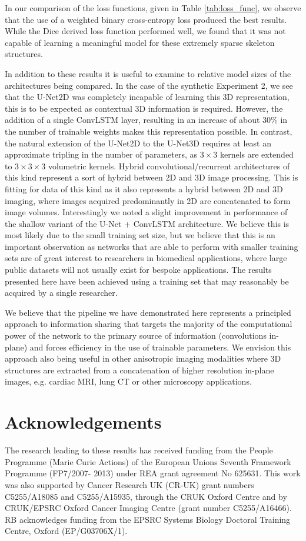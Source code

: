 \documentclass[journal,transmag]{IEEEtran}
\begin{document}
In our comparison of the loss functions, given in Table \ref{tab:loss_func}, we observe that the use of a weighted binary cross-entropy loss produced the best results. While the Dice derived loss function performed well, we found that it was not capable of learning a meaningful model for these extremely sparse skeleton structures.

In addition to these results it is useful to examine to relative model sizes of the architectures being compared. In the case of the synthetic Experiment 2, we see that the U-Net2D was completely incapable of learning this 3D representation, this is to be expected as contextual 3D information is required. However, the addition of a single ConvLSTM layer, resulting in an increase of about 30\% in the number of trainable weights makes this representation possible. In contrast, the natural extension of the U-Net2D to the U-Net3D requires at least an approximate tripling in the number of parameters, as $3\times3$ kernels are extended to $3\times3\times3$ volumetric kernels. Hybrid convolutional/recurrent architectures of this kind represent a sort of hybrid between 2D and 3D image processing. This is fitting for data of this kind as it also represents a hybrid between 2D and 3D imaging, where images acquired predominantly in 2D are concatenated to form image volumes. Interestingly we noted a slight improvement in performance of the shallow variant of the U-Net + ConvLSTM architecture. We believe this is most likely due to the small training set size, but we believe that this is an important observation as networks that are able to perform with smaller training sets are of great interest to researchers in biomedical applications, where large public datasets will not usually exist for bespoke applications. The results presented here have been achieved using a training set that may reasonably be acquired by a single researcher.

We believe that the pipeline we have demonstrated here represents a principled approach to information sharing that targets the majority of the computational power of the network to the primary source of information (convolutions in-plane) and forces efficiency in the use of trainable parameters. We envision this approach also being useful in other anisotropic imaging modalities where 3D structures are extracted from a concatenation of higher resolution in-plane images, e.g. cardiac MRI, lung CT or other microscopy applications.

\section{Acknowledgements}

The research leading to these results has received funding
from the People Programme (Marie Curie Actions) of the
European Unions Seventh Framework Programme (FP7/2007-
2013) under REA grant agreement No 625631. This work
was also supported by Cancer Research UK (CR-UK) grant
numbers C5255/A18085 and C5255/A15935, through the
CRUK Oxford Centre and by CRUK/EPSRC Oxford Cancer Imaging Centre (grant number C5255/A16466). RB acknowledges funding from the
EPSRC Systems Biology Doctoral Training Centre, Oxford
(EP/G03706X/1).



\end{document}

